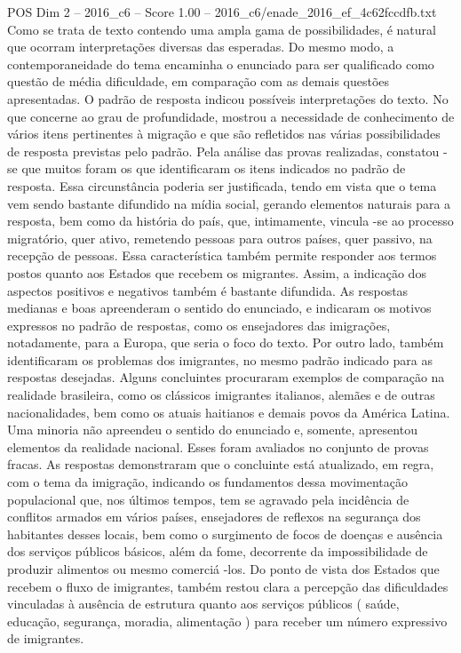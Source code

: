 \begin{textsample}{POS Dim 2 – 2016\_c6 – Score 1.00 – 2016\_c6/enade\_2016\_ef\_4c62fccdfb.txt}
Como se trata de texto contendo uma ampla gama de possibilidades, é natural que ocorram interpretações diversas das esperadas.
Do mesmo modo, a contemporaneidade do tema encaminha o enunciado para ser qualificado como questão de média dificuldade, em comparação com as demais questões apresentadas.
O padrão de resposta indicou possíveis interpretações do texto.
No que concerne ao grau de profundidade, mostrou a necessidade de conhecimento de vários itens pertinentes à migração e que são refletidos nas várias possibilidades de resposta previstas pelo padrão.
Pela análise das provas realizadas, constatou -se que muitos foram os que identificaram os itens indicados no padrão de resposta.
Essa circunstância poderia ser justificada, tendo em vista que o tema vem sendo bastante difundido na mídia social, gerando elementos naturais para a resposta, bem como da história do país, que, intimamente, vincula -se ao processo migratório, quer ativo, remetendo pessoas para outros países, quer passivo, na recepção de pessoas.
Essa característica também permite responder aos termos postos quanto aos Estados que recebem os migrantes.
Assim, a indicação dos aspectos positivos e negativos também é bastante difundida.
As respostas medianas e boas apreenderam o sentido do enunciado, e indicaram os motivos expressos no padrão de respostas, como os ensejadores das imigrações, notadamente, para a Europa, que seria o foco do texto.
Por outro lado, também identificaram os problemas dos imigrantes, no mesmo padrão indicado para as respostas desejadas.
Alguns concluintes procuraram exemplos de comparação na realidade brasileira, como os clássicos imigrantes italianos, alemães e de outras nacionalidades, bem como os atuais haitianos e demais povos da América Latina.
Uma minoria não apreendeu o sentido do enunciado e, somente, apresentou elementos da realidade nacional.
Esses foram avaliados no conjunto de provas fracas.
As respostas demonstraram que o concluinte está atualizado, em regra, com o tema da imigração, indicando os fundamentos dessa movimentação populacional que, nos últimos tempos, tem se agravado pela incidência de conflitos armados em vários países, ensejadores de reflexos na segurança dos habitantes desses locais, bem como o surgimento de focos de doenças e ausência dos serviços públicos básicos, além da fome, decorrente da impossibilidade de produzir alimentos ou mesmo comerciá -los.
Do ponto de vista dos Estados que recebem o fluxo de imigrantes, também restou clara a percepção das dificuldades vinculadas à ausência de estrutura quanto aos serviços públicos ( saúde, educação, segurança, moradia, alimentação ) para receber um número expressivo de imigrantes.

\end{textsample}
